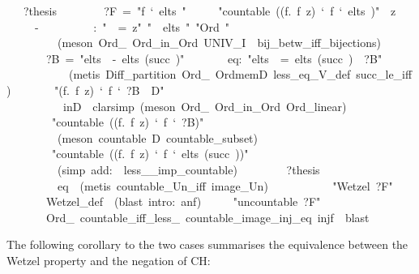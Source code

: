\documentclass[runningheads]{llncs}
\begin{document}
\begin{isabelle}
\ \ \ ?thesis\isanewline
\ \ \isanewline
\ \ \ \ \ ?F\ =\ "f\ `\ elts\ "\isanewline
\ \ \ \ \ "countable\ ((\isasymlambda f.\ f\ z)\ `\ f\ `\ elts\ )"\ \ z\isanewline
\ \ \ \ \ -\isanewline
\ \ \ \ \ \ \ \isasymalpha \ \ \isasymalpha :\ "\isasymzeta \ \isasymalpha \ =\ z"\ "\isasymalpha \ \isasymin \ elts\ "\ "Ord\ \isasymalpha "\isanewline
\ \ \ \ \ \ \ \ \ (meson\ Ord\_\ Ord\_in\_Ord\ UNIV\_I\ \isasymzeta \ bij\_betw\_iff\_bijections)\isanewline
\ \ \ \ \ \ \ ?B\ =\ "elts\ \ -\ elts\ (succ\ \isasymalpha )"\isanewline
\ \ \ \ \ \ \ eq:\ "elts\ \ =\ elts\ (succ\ \isasymalpha)\ \isasymunion \ ?B"\isanewline
\ \ \ \ \ \ \ \ \ \isasymalpha \ \ (metis\ Diff\_partition\ Ord\_\ OrdmemD\ less\_eq\_V\_def\ succ\_le\_iff)\isanewline
\ \ \ \ \ \ \ "(\isasymlambda f.\ f\ z)\ `\ f\ `\ ?B\ \isasymsubseteq \ D"\isanewline
\ \ \ \ \ \ \ \ \ \isasymalpha \ inD\ \ clarsimp\ (meson\ Ord\_\ Ord\_in\_Ord\ Ord\_linear)\isanewline
\ \ \ \ \ \ \ \ "countable\ ((\isasymlambda f.\ f\ z)\ `\ f\ `\ ?B)"\isanewline
\ \ \ \ \ \ \ \ \ (meson\ \isacartoucheopen countable\ D\isacartoucheclose \ countable\_subset)\isanewline
\ \ \ \ \ \ \ \ "countable\ ((\isasymlambda f.\ f\ z)\ `\ f\ `\ elts\ (succ\ \isasymalpha ))"\isanewline
\ \ \ \ \ \ \ \ \ (simp\ add:\ \isasymalpha \ less\_\_imp\_countable)\isanewline
\ \ \ \ \ \ \ \ ?thesis\isanewline
\ \ \ \ \ \ \ \ \ eq\ \ (metis\ countable\_Un\_iff\ image\_Un)\isanewline
\ \ \ \ \isanewline
\ \ \ \ \ \ "Wetzel\ ?F"\isanewline
\ \ \ \ \ \ \ Wetzel\_def\ \ (blast\ intro:\ anf)\isanewline
\ \ \ \ \ "uncountable\ ?F"\isanewline
\ \ \ \ \ \ \ Ord\_\ countable\_iff\_less\_\ countable\_image\_inj\_eq\ injf\ \ blast\isanewline
\ \ \isanewline
{}
\end{isabelle}

The following corollary to the two cases summarises the equivalence between the Wetzel property and the negation of CH:
\end{document}
